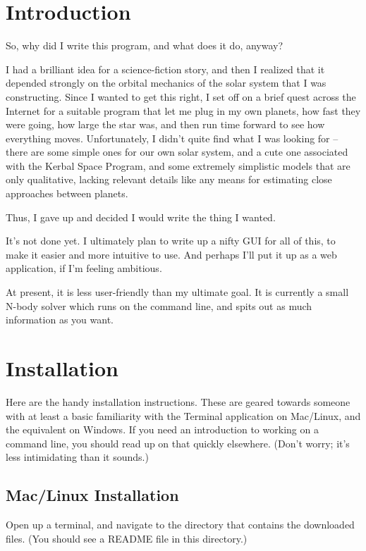 \documentclass{article}
\begin{document}
\tableofcontents

\section{Introduction}

So, why did I write this program, and what does it do, anyway?

I had a brilliant idea for a science-fiction story, and then I realized that it depended strongly on the orbital mechanics of the solar system that I was constructing.  Since I wanted to get this right, I set off on a brief quest across the Internet for a suitable program that let me plug in my own planets, how fast they were going, how large the star was, and then run time forward to see how everything moves.  Unfortunately, I didn't quite find what I was looking for -- there are some simple ones for our own solar system, and a cute one associated with the Kerbal Space Program, and some extremely simplistic models that are only qualitative, lacking relevant details like any means for estimating close approaches between planets.

Thus, I gave up and decided I would write the thing I wanted.

It's not done yet.  I ultimately plan to write up a nifty GUI for all of this, to make it easier and more intuitive to use.  And perhaps I'll put it up as a web application, if I'm feeling ambitious.

At present, it is less user-friendly than my ultimate goal.  It is currently a small N-body solver which runs on the command line, and spits out as much information as you want.  

\section{Installation}

Here are the handy installation instructions.  These are geared towards someone with at least a basic familiarity with the Terminal application on Mac/Linux, and the equivalent on Windows.  If you need an introduction to working on a command line, you should read up on that quickly elsewhere.  (Don't worry; it's less intimidating than it sounds.)

\subsection{Mac/Linux Installation}

Open up a terminal, and navigate to the directory that contains the downloaded files.  (You should see a README file in this directory.)
\end{document}
